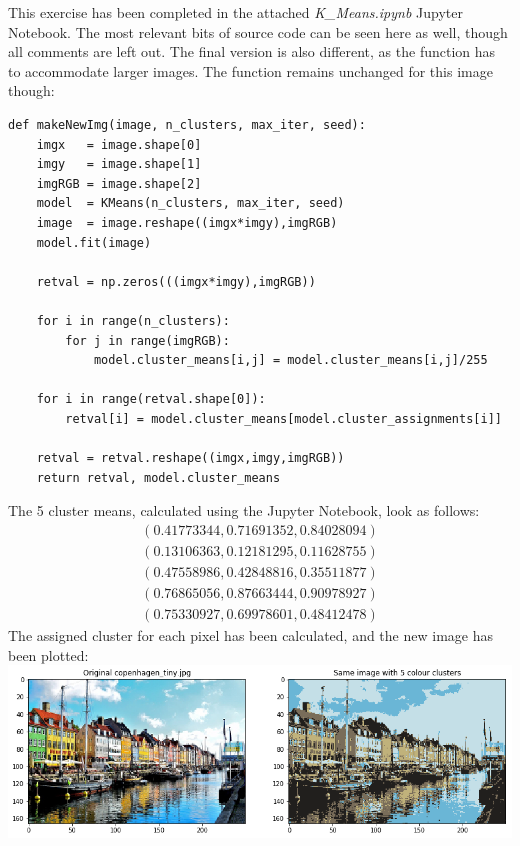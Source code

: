 This exercise has been completed in the attached \textit{K\_Means.ipynb} Jupyter Notebook. The most relevant bits of source code can be seen here as well, though all comments are left out. The final version is also different, as the function has to accommodate larger images. The function remains unchanged for this image though:
\begin{verbatim}
def makeNewImg(image, n_clusters, max_iter, seed):
    imgx   = image.shape[0]
    imgy   = image.shape[1]
    imgRGB = image.shape[2]
    model  = KMeans(n_clusters, max_iter, seed)
    image  = image.reshape((imgx*imgy),imgRGB)
    model.fit(image)
    
    retval = np.zeros(((imgx*imgy),imgRGB))

    for i in range(n_clusters):
        for j in range(imgRGB):
            model.cluster_means[i,j] = model.cluster_means[i,j]/255
            
    for i in range(retval.shape[0]):
        retval[i] = model.cluster_means[model.cluster_assignments[i]]
        
    retval = retval.reshape((imgx,imgy,imgRGB))
    return retval, model.cluster_means
\end{verbatim}
The 5 cluster means, calculated using the Jupyter Notebook, look as follows:
$$
\begin{matrix}
(0.41773344, 0.71691352, 0.84028094) \\[3pt]
(0.13106363, 0.12181295, 0.11628755) \\[3pt]
(0.47558986, 0.42848816, 0.35511877) \\[3pt]
(0.76865056, 0.87663444, 0.90978927) \\[3pt]
(0.75330927, 0.69978601, 0.48412478)
\end{matrix}
$$
The assigned cluster for each pixel has been calculated, and the new image has been plotted:\\
\includegraphics[width=\linewidth]{3b1.png}\\